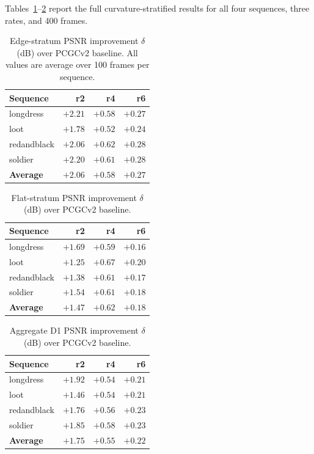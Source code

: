 Tables~\ref{tab:results-edge-r2}--\ref{tab:results-flat} report the full
curvature-stratified results for all four sequences, three rates, and
400 frames.

\begin{table}[t]
  \centering
  \caption{%
    Edge-stratum PSNR improvement $\delta$ (dB) over PCGCv2 baseline.
    All values are average over 100 frames per sequence.
  }
  \label{tab:results-edge-r2}
  \begin{tabular}{lrrr}
    \toprule
    Sequence & r2 & r4 & r6 \\
    \midrule
    longdress   & $+2.21$ & $+0.58$ & $+0.27$ \\
    loot        & $+1.78$ & $+0.52$ & $+0.24$ \\
    redandblack & $+2.06$ & $+0.62$ & $+0.28$ \\
    soldier     & $+2.20$ & $+0.61$ & $+0.28$ \\
    \midrule
    \textbf{Average} & $\mathbf{+2.06}$ & $\mathbf{+0.58}$ & $\mathbf{+0.27}$ \\
    \bottomrule
  \end{tabular}
\end{table}

\begin{table}[t]
  \centering
  \caption{%
    Flat-stratum PSNR improvement $\delta$ (dB) over PCGCv2 baseline.
  }
  \label{tab:results-flat}
  \begin{tabular}{lrrr}
    \toprule
    Sequence & r2 & r4 & r6 \\
    \midrule
    longdress   & $+1.69$ & $+0.59$ & $+0.16$ \\
    loot        & $+1.25$ & $+0.67$ & $+0.20$ \\
    redandblack & $+1.38$ & $+0.61$ & $+0.17$ \\
    soldier     & $+1.54$ & $+0.61$ & $+0.18$ \\
    \midrule
    \textbf{Average} & $\mathbf{+1.47}$ & $\mathbf{+0.62}$ & $\mathbf{+0.18}$ \\
    \bottomrule
  \end{tabular}
\end{table}

\begin{table}[t]
  \centering
  \caption{%
    Aggregate D1 PSNR improvement $\delta$ (dB) over PCGCv2 baseline.
  }
  \label{tab:results-d1}
  \begin{tabular}{lrrr}
    \toprule
    Sequence & r2 & r4 & r6 \\
    \midrule
    longdress   & $+1.92$ & $+0.54$ & $+0.21$ \\
    loot        & $+1.46$ & $+0.54$ & $+0.21$ \\
    redandblack & $+1.76$ & $+0.56$ & $+0.23$ \\
    soldier     & $+1.85$ & $+0.58$ & $+0.23$ \\
    \midrule
    \textbf{Average} & $\mathbf{+1.75}$ & $\mathbf{+0.55}$ & $\mathbf{+0.22}$ \\
    \bottomrule
  \end{tabular}
\end{table}

